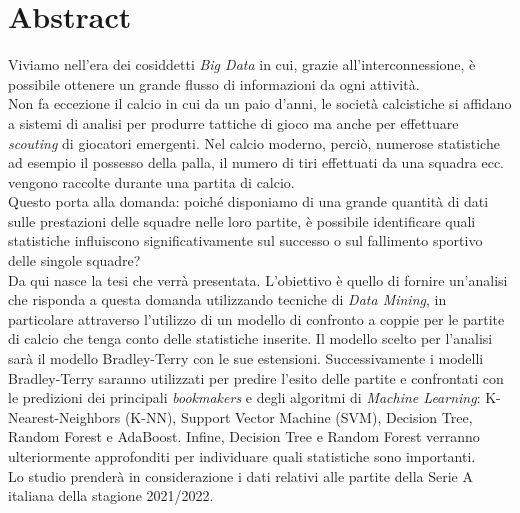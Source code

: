 
\cleardoublepage
{}
{}
\begingroup
\let\clearpage\relax
\let\cleardoublepage\relax
\let\cleardoublepage\relax

\chapter*{Abstract}

Viviamo nell'era dei cosiddetti \emph{Big Data} in cui, grazie all'interconnessione, è possibile ottenere un grande flusso di informazioni da ogni attività. \\
Non fa eccezione il calcio in cui da un paio d'anni, le società calcistiche si affidano a sistemi di analisi per produrre tattiche di gioco ma anche per effettuare \textit{scouting} di giocatori emergenti. Nel calcio moderno, perciò, numerose statistiche ad esempio il possesso della palla, il numero di tiri effettuati da una squadra ecc. vengono raccolte durante una partita di calcio.\\
Questo porta alla domanda: poiché disponiamo di una grande quantità di dati sulle prestazioni delle squadre nelle loro partite, è possibile identificare quali statistiche influiscono significativamente sul successo o sul fallimento sportivo delle singole squadre? \\
Da qui nasce la tesi che verrà presentata. L'obiettivo è quello di fornire un'analisi che risponda a questa domanda utilizzando tecniche di \emph{Data Mining}, in particolare attraverso l'utilizzo di un modello di confronto a coppie per le partite di calcio che tenga conto delle statistiche inserite. Il modello scelto per l'analisi sarà il modello Bradley-Terry con le sue estensioni.
Successivamente i modelli Bradley-Terry saranno utilizzati per predire l’esito delle partite e confrontati con le predizioni dei principali \emph{bookmakers} e degli algoritmi di \emph{Machine Learning}:  K-Nearest-Neighbors (K-NN), Support Vector Machine (SVM), Decision Tree, Random Forest e AdaBoost. Infine, Decision Tree e Random Forest verranno ulteriormente approfonditi per individuare quali statistiche sono importanti.\\
Lo studio prenderà in considerazione i dati relativi alle partite della Serie A italiana della stagione 2021/2022.






%
%

\endgroup			

\vfill

